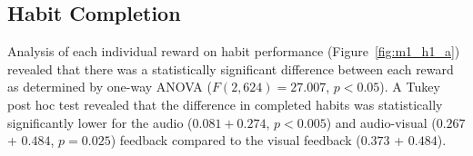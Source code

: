 \documentclass{scaffold/sigchi}
\begin{document}
\subsection{Habit Completion}
Analysis of each individual reward on habit performance (Figure~\ref{fig:m1_h1_a}) revealed that there was a statistically significant difference between each reward as determined by one-way ANOVA ($F(2,624) = 27.007$, $p < 0.05$). A Tukey post hoc test revealed that the difference in completed habits was statistically significantly lower for the audio ($0.081 + 0.274$, $p < 0.005$) and audio-visual ($0.267$ + $0.484$, $p = 0.025$) feedback compared to the visual feedback ($0.373$ + $0.484$).














\end{document}
